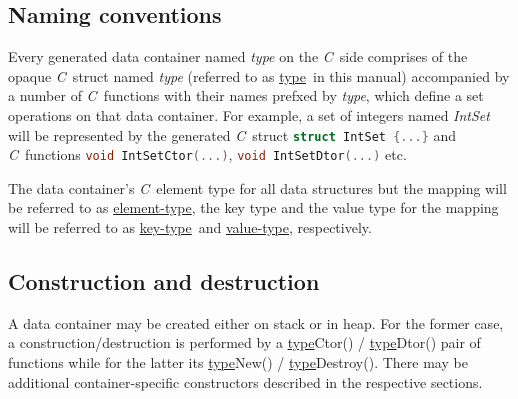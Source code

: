 \documentclass[a4paper]{article}
\newcommand{\C}{\emph{C}}
\newcommand{\st}{\underline{type}}
\newcommand{\et}{\underline{element-type}}
\newcommand{\kt}{\underline{key-type}}
\newcommand{\vt}{\underline{value-type}}
\newcommand{\sv}{\emph{self}}
\newcommand{\meth}[1]{#1}
\begin{document}
\newcommand{\commonmethods}{


\item \meth{void \st Dtor(\st*\ \sv)}


Destroys the container along with all contained elements.


\item \meth{void \st Destroy(\st* \sv)}


Frees the heap-allocated container destroying all contained elements.
Calls the respective destructor \meth{\st Dtor()} behind the scenes.


\item \meth{\st* \st Assign(\st* \sv)}


\emph{Should be called on heap-allocated containers only.}


\item \meth{size\_t \st Size(\st* \sv)}


Returns the number of elements in container.

	
}


\subsection{Naming conventions}


Every generated data container named \emph{type} on the \C\ side comprises of the opaque \C\ struct named \emph{type} (referred to as \st\ in this manual) accompanied by a number of \C\ functions with their names prefxed by \emph{type}, which define a set operations on that data container.
For example, a set of integers named \emph{IntSet} will be represented by the generated \C\ struct \lstinline[language=C]!struct IntSet {...}! and \C\ functions \lstinline[language=C]!void IntSetCtor(...)!, \lstinline[language=C]!void IntSetDtor(...)! etc.

The data container's \C\ element type for all data structures but the mapping will be referred to as \et, the key type and the value type for the mapping will be referred to as \kt\ and \vt, respectively.


\subsection{Construction and destruction}


A data container may be created either on stack or in heap.
For the former case, a construction/destruction is performed by a \meth{\st Ctor()} / \meth{\st Dtor()} pair of functions while for the latter its \meth{\st New()} / \meth{\st Destroy()}.
There may be additional container-specific constructors described in the respective sections.
\end{document}
